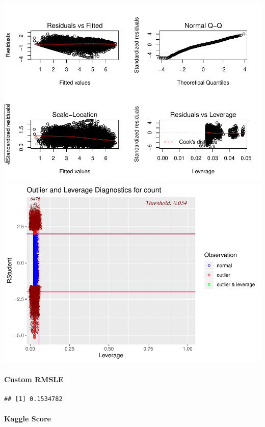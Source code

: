\documentclass[american,]{article}
\let\oldparagraph\paragraph
\renewcommand{\paragraph}[1]{\oldparagraph{#1}\mbox{}}
\begin{document}
\includegraphics{BikeSharingDemand_files/figure-latex/custom-model-1.pdf} \includegraphics{BikeSharingDemand_files/figure-latex/custom-model-2.pdf}

\hypertarget{custom-rmsle}{%
\paragraph{Custom RMSLE}\label{custom-rmsle}}

\begin{verbatim}
## [1] 0.1534782
\end{verbatim}

\hypertarget{kaggle-score}{%
\paragraph{Kaggle Score}\label{kaggle-score}}
\end{document}

